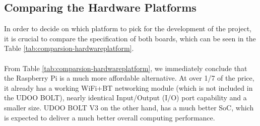 \subsection{Comparing the Hardware Platforms}

In order to decide on which platform to pick for the development of the project, it is crucial to compare the specification of both boards, which can be seen in the Table \ref{tab:comparsion-hardwareplatform}.

\paragraph{} From Table \ref{tab:comparsion-hardwareplatform}, we immediately conclude that the Raspberry Pi is a much more affordable alternative. At over 1/7 of the price, it already has a working WiFi+BT networking module (which is not included in the UDOO BOLT), nearly identical Input/Output (I/O) port capability and a smaller size. UDOO BOLT V3 on the other hand, has a much better SoC, which is expected to deliver a much better overall computing performance.

